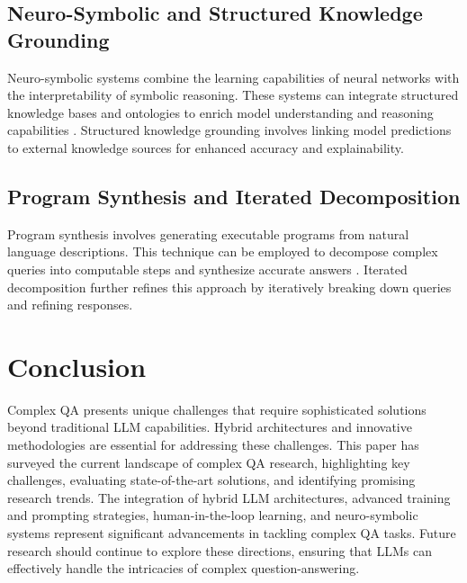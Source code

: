 \documentclass{article}
\begin{document}
\subsection{Neuro-Symbolic and Structured Knowledge Grounding}
Neuro-symbolic systems combine the learning capabilities of neural networks with the interpretability of symbolic reasoning. These systems can integrate structured knowledge bases and ontologies to enrich model understanding and reasoning capabilities \cite{garcez2012neural}. Structured knowledge grounding involves linking model predictions to external knowledge sources for enhanced accuracy and explainability.

\subsection{Program Synthesis and Iterated Decomposition}
Program synthesis involves generating executable programs from natural language descriptions. This technique can be employed to decompose complex queries into computable steps and synthesize accurate answers \cite{chen2021program}. Iterated decomposition further refines this approach by iteratively breaking down queries and refining responses.

\section{Conclusion}
Complex QA presents unique challenges that require sophisticated solutions beyond traditional LLM capabilities. Hybrid architectures and innovative methodologies are essential for addressing these challenges. This paper has surveyed the current landscape of complex QA research, highlighting key challenges, evaluating state-of-the-art solutions, and identifying promising research trends. The integration of hybrid LLM architectures, advanced training and prompting strategies, human-in-the-loop learning, and neuro-symbolic systems represent significant advancements in tackling complex QA tasks. Future research should continue to explore these directions, ensuring that LLMs can effectively handle the intricacies of complex question-answering.



\end{document}
